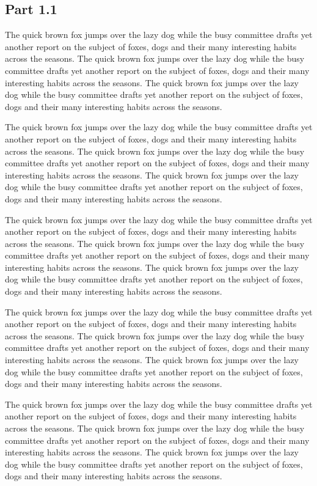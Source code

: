 \documentclass{article}
\begin{document}
\subsection{Part 1.1}
The quick brown fox jumps over the lazy dog while the busy committee drafts yet another report on the subject of foxes, dogs and their many interesting habits across the seasons. The quick brown fox jumps over the lazy dog while the busy committee drafts yet another report on the subject of foxes, dogs and their many interesting habits across the seasons. The quick brown fox jumps over the lazy dog while the busy committee drafts yet another report on the subject of foxes, dogs and their many interesting habits across the seasons. 

The quick brown fox jumps over the lazy dog while the busy committee drafts yet another report on the subject of foxes, dogs and their many interesting habits across the seasons. The quick brown fox jumps over the lazy dog while the busy committee drafts yet another report on the subject of foxes, dogs and their many interesting habits across the seasons. The quick brown fox jumps over the lazy dog while the busy committee drafts yet another report on the subject of foxes, dogs and their many interesting habits across the seasons. 

The quick brown fox jumps over the lazy dog while the busy committee drafts yet another report on the subject of foxes, dogs and their many interesting habits across the seasons. The quick brown fox jumps over the lazy dog while the busy committee drafts yet another report on the subject of foxes, dogs and their many interesting habits across the seasons. The quick brown fox jumps over the lazy dog while the busy committee drafts yet another report on the subject of foxes, dogs and their many interesting habits across the seasons. 

The quick brown fox jumps over the lazy dog while the busy committee drafts yet another report on the subject of foxes, dogs and their many interesting habits across the seasons. The quick brown fox jumps over the lazy dog while the busy committee drafts yet another report on the subject of foxes, dogs and their many interesting habits across the seasons. The quick brown fox jumps over the lazy dog while the busy committee drafts yet another report on the subject of foxes, dogs and their many interesting habits across the seasons. 

The quick brown fox jumps over the lazy dog while the busy committee drafts yet another report on the subject of foxes, dogs and their many interesting habits across the seasons. The quick brown fox jumps over the lazy dog while the busy committee drafts yet another report on the subject of foxes, dogs and their many interesting habits across the seasons. The quick brown fox jumps over the lazy dog while the busy committee drafts yet another report on the subject of foxes, dogs and their many interesting habits across the seasons. 
\end{document}
